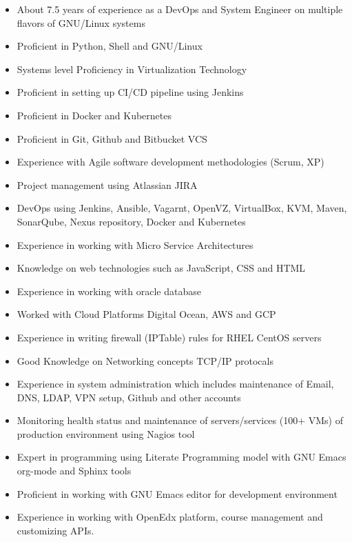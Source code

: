 \documentclass[letterpaper,11pt]{article}
\begin{document}
  \begin{itemize}
     
\item About 7.5 years of experience as a DevOps and System Engineer on
  multiple flavors of GNU/Linux systems
\item Proficient in Python, Shell and GNU/Linux
\item Systems level Proficiency in Virtualization Technology
\item Proficient in setting up CI/CD pipeline using Jenkins
\item Proficient in Docker and Kubernetes
\item Proficient in Git, Github and Bitbucket VCS
\item Experience with Agile software development methodologies (Scrum, XP)
\item Project management using Atlassian JIRA
\item DevOps using Jenkins, Ansible, Vagarnt, OpenVZ, VirtualBox, KVM, Maven, SonarQube, Nexus repository, Docker and Kubernetes
\item Experience in working with Micro Service Architectures
\item Knowledge on web technologies such as JavaScript, CSS and HTML
\item Experience in working with oracle database
\item Worked with Cloud Platforms Digital Ocean, AWS and GCP

\item Experience in writing firewall (IPTable) rules for RHEL CentOS servers
\item Good Knowledge on Networking concepts TCP/IP protocals
\item Experience in system administration which includes maintenance of Email, DNS, LDAP, VPN setup, Github
  and other accounts
\item Monitoring health status and maintenance of servers/services (100+ VMs) of production environment using
Nagios tool
\item Expert in programming using Literate Programming model with GNU Emacs org-mode and Sphinx tools
\item Proficient in working with GNU Emacs editor for development environment
\item Experience in working with OpenEdx platform, course management and customizing APIs.
  

  \end{itemize}
\end{document}
